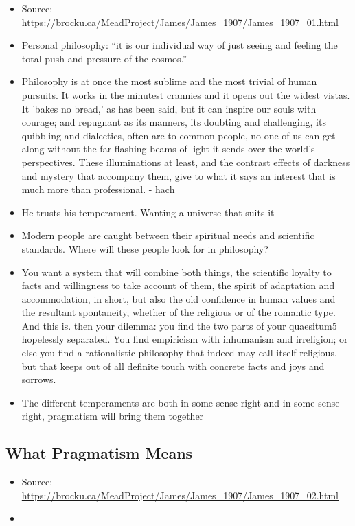 \documentclass[emulatestandardclasses]{scrartcl}
\begin{document}
\begin{itemize}
  \item Source: \url{https://brocku.ca/MeadProject/James/James_1907/James_1907_01.html}
  \item Personal philosophy: "`it is our individual way of just seeing and feeling the total push and pressure of the cosmos."'
  \item Philosophy is at once the most sublime and the most trivial of human pursuits. It works in the minutest crannies and it opens out the widest vistas. It 'bakes no bread,' as has been said, but it can inspire our souls with courage; and repugnant as its manners, its doubting and challenging, its quibbling and dialectics, often are to common people, no one of us can get along without the far-flashing beams of light it sends over the world's perspectives. These illuminations at least, and the contrast effects of darkness and mystery that accompany them, give to what it says an interest that is much more than professional. - hach
  \item He trusts his temperament. Wanting a universe that suits it
  \item Modern people are caught between their spiritual needs and scientific standards. Where will these people look for in philosophy?
  \item You want a system that will combine both things, the scientific loyalty to facts and willingness to take account of them, the spirit of adaptation and accommodation, in short, but also the old confidence in human values and the resultant spontaneity, whether of the religious or of the romantic type. And this is. then your dilemma: you find the two parts of your quaesitum5 hopelessly separated. You find empiricism with inhumanism and irreligion; or else you find a rationalistic philosophy that indeed may call itself religious, but that keeps out of all definite touch with concrete facts and joys and sorrows.
  \item The different temperaments are both in some sense right and in some sense right, pragmatism will bring them together
\end{itemize}

\subsection{What Pragmatism Means}

\begin{itemize}
  \item Source: \url{https://brocku.ca/MeadProject/James/James_1907/James_1907_02.html}
  \item 
\end{itemize}
\end{document}
